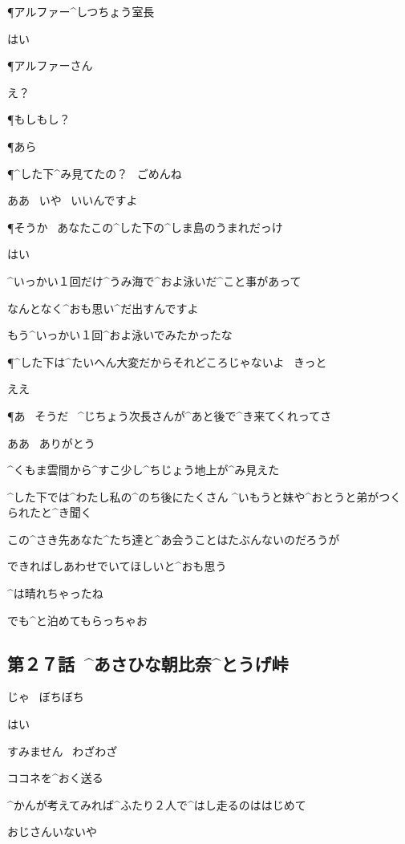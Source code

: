 \P アルファー^{しつちょう}{室長}

\AM はい

\P アルファーさん

\AM え？

\P もしもし？

\P あら

\P ^{した}{下}^{み}{見}てたの？
\ ごめんね

\page
\AM ああ
\ いや
\ いいんですよ

\P そうか
\ あなたこの^{した}{下}の^{しま}{島}のうまれだっけ

\AM はい

\AM ^{いっかい}{１回}だけ^{うみ}{海}で^{およ}{泳}いだ^{こと}{事}があって

\AM なんとなく^{おも}{思}い^{だ}{出}すんですよ

\page
\AM もう^{いっかい}{１回}^{およ}{泳}いでみたかったな

\P ^{した}{下}は^{たいへん}{大変}だからそれどころじゃないよ
\ きっと

\AM ええ

\P あ
\ そうだ
\ ^{じちょう}{次長}さんが^{あと}{後}で^{き}{来}てくれってさ

\AM ああ
\ ありがとう

\page
\AM ^{くもま}{雲間}から^{すこ}{少}し^{ちじょう}{地上}が^{み}{見}えた

\AM ^{した}{下}では^{わたし}{私}の^{のち}{後}にたくさん
^{いもうと}{妹}や^{おとうと}{弟}がつくられたと^{き}{聞}く

\page
\AM この^{さき}{先}あなた^{たち}{達}と^{あ}{会}うことはたぶんないのだろうが

\AM できればしあわせでいてほしいと^{おも}{思}う

\page[52]
\A ^{は}{晴}れちゃったね

\K でも^{と}{泊}めてもらっちゃお


\subsection{第２７話\ ^{あさひな}{朝比奈}^{とうげ}{峠}}

\page[55]
\A じゃ
\ ぼちぼち

\K はい

\K すみません
\ わざわざ

\A ココネを^{おく}{送}る

\A ^{かんが}{考}えてみれば^{ふたり}{２人}で^{はし}{走}るのははじめて

\page
\A おじさんいないや

